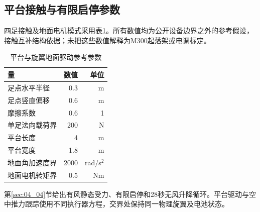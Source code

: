 \subsection{平台接触与有限启停参数}
四足接触及地面电机模式采用表\ref{s0601:contact_parameters}。所有数值均为公开设备边界之外的参考假设，接触互补结构依据\cite{PosaContact2014}；未把这些数值解释为M300起落架或电调标定。
\begin{table}[!ht]\centering\small
\caption{平台与旋翼地面驱动参考参数}\label{s0601:contact_parameters}
\begin{tabular}{@{}lrr@{}}\toprule
量 & 数值 & 单位\\\midrule
足点水平半径 & 0.3 & m\\
足点竖直偏移 & 0.6 & m\\
摩擦系数 & 0.6 & 1\\
单足法向载荷界 & 200 & N\\
平台长度 & 4 & m\\
平台宽度 & 1.8 & m\\
地面角加速度界 & 2000 & rad/s$^2$\\
地面电机转矩界 & 0.5 & Nm\\\bottomrule
\end{tabular}\end{table}
第\ref{sec:04_04}节给出有风静态受力、有限启停和28秒无风升降循环。平台驱动与空中推力跟踪使用不同执行器方程，交界处保持同一物理旋翼及电池状态。

